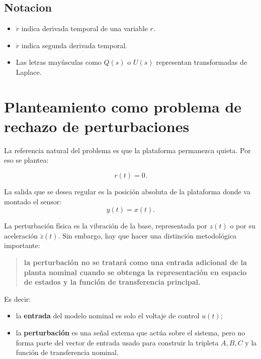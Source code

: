 \documentclass[11pt]{article}
\begin{document}
\subsection{Notacion}

\begin{itemize}[leftmargin=1.2cm]
\item $\dot r$ indica derivada temporal de una variable $r$.
\item $\ddot r$ indica segunda derivada temporal.
\item Las letras may\'usculas como $Q(s)$ o $U(s)$ representan transformadas de Laplace.
\end{itemize}

\section{Planteamiento como problema de rechazo de perturbaciones}

La referencia natural del problema es que la plataforma permanezca quieta. Por eso se plantea:

\begin{equation}
r(t)=0.
\end{equation}

La salida que se desea regular es la posici\'on absoluta de la plataforma donde va montado el sensor:
\begin{equation}
y(t)=x(t).
\end{equation}

La perturbaci\'on f\'isica es la vibraci\'on de la base, representada por $z(t)$ o por su aceleraci\'on $\ddot z(t)$. Sin embargo, hay que hacer una distinci\'on metodol\'ogica importante:

\begin{quote}
\textbf{la perturbaci\'on no se tratar\'a como una entrada adicional de la planta nominal cuando se obtenga la representaci\'on en espacio de estados y la funci\'on de transferencia principal.}
\end{quote}

Es decir:

\begin{itemize}[leftmargin=1.2cm]
\item la \textbf{entrada} del modelo nominal es solo el voltaje de control $u(t)$;
\item la \textbf{perturbaci\'on} es una se\~nal externa que act\'ua sobre el sistema, pero no forma parte del vector de entrada usado para construir la tripleta $A,B,C$ y la funci\'on de transferencia nominal.
\end{itemize}
\end{document}
